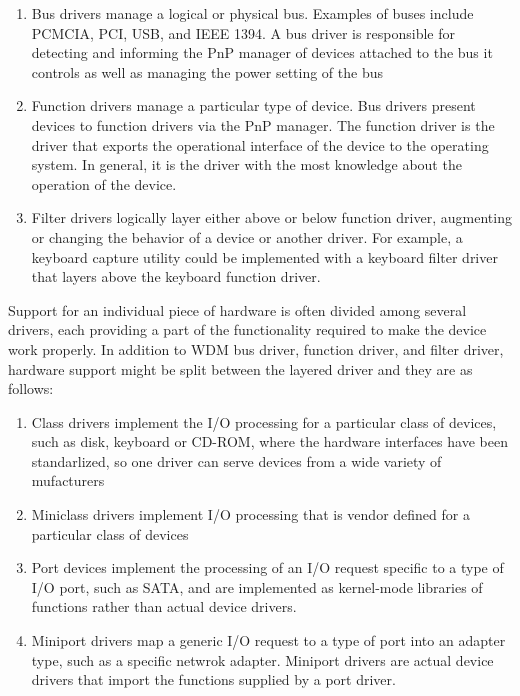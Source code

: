 \documentclass[letterpaper,10pt,draftclsnofoot,onecolumn]{IEEEtran}
\begin{document}
\begin{enumerate}
\item Bus drivers manage a logical or physical bus. Examples of buses include PCMCIA, PCI, USB, and IEEE 1394. A bus driver is responsible for detecting and informing the PnP manager of devices attached to the bus it controls as well as managing the power setting of the bus
\item Function drivers manage a particular type of device. Bus drivers present devices to function drivers via the PnP manager. The function driver is the driver that exports the operational interface of the device to the operating system. In general, it is the driver with the most knowledge about the operation of the device.
\item Filter drivers logically layer either above or below function driver, augmenting or changing the behavior of a device or another driver. For example, a keyboard capture utility could be implemented with a keyboard filter driver that layers above the keyboard function driver.
\end{enumerate}

Support for an individual piece of hardware is often divided among several drivers, each providing a part of the functionality required to make the device work properly. In addition to WDM bus driver, function driver, and filter driver, hardware support might be split between the layered driver and they are as follows: \cite{[1]}

\begin{enumerate}
\item Class drivers implement the I/O processing for a particular class of devices, such as disk, keyboard or CD-ROM, where the hardware interfaces have been standarlized, so one driver can serve devices from a wide variety of mufacturers
\item Miniclass drivers implement I/O processing that is vendor defined for a particular class of devices
\item Port devices implement the processing of an I/O request specific to a type of I/O port, such as SATA, and are implemented as kernel-mode libraries of functions rather than actual device drivers.
\item Miniport drivers map a generic I/O request to a type of port into an adapter type, such as a specific netwrok adapter. Miniport drivers are actual device drivers that import the functions supplied by a port driver.
\end{enumerate}
\end{document}
